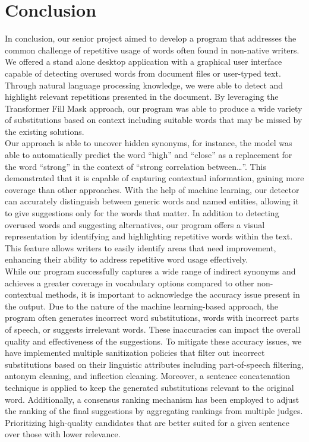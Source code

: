 \documentclass[12pt,oneside,openright,a4paper]{cpe-english-project}
\begin{document}
\chapter{Conclusion}

In conclusion, our senior project aimed to develop a program that addresses the common challenge of repetitive usage of words often found in non-native writers. We offered a stand alone desktop application with a graphical user interface capable of detecting overused words from document files or user-typed text. Through natural language processing knowledge, we were able to detect and highlight relevant repetitions presented in the document. By leveraging the Transformer Fill Mask approach, our program was able to produce a wide variety of substitutions based on context including suitable words that may be missed by the existing solutions.\\

Our approach is able to uncover hidden synonyms, for instance,  the model was able to automatically predict the word “high” and “close” as a replacement for the word “strong” in the context of “strong correlation between…”. This demonstrated that it is capable of capturing contextual information, gaining more coverage than other approaches.
With the help of machine learning, our detector can accurately distinguish between generic words and named entities, allowing it to give suggestions only for the words that matter. In addition to detecting overused words and suggesting alternatives, our program offers a visual representation by identifying and highlighting repetitive words within the text. This feature allows writers to easily identify areas that need improvement, enhancing their ability to address repetitive word usage effectively.\\



While our program successfully captures a wide range of indirect synonyms and achieves a greater coverage in vocabulary options compared to other non-contextual methods, it is important to acknowledge the accuracy issue present in the output. Due to the nature of the machine learning-based approach, the program often generates incorrect word substitutions, words with incorrect parts of speech, or suggests irrelevant words. These inaccuracies can impact the overall quality and effectiveness of the suggestions. To mitigate these accuracy issues, we have implemented multiple sanitization policies that filter out incorrect substitutions based on their linguistic attributes including part-of-speech filtering, antonym cleaning, and inflection cleaning. Moreover, a sentence concatenation technique is applied to keep the generated substitutions relevant to the original word. Additionally, a consensus ranking mechanism has been employed to adjust the ranking of the final suggestions by aggregating rankings from multiple judges. Prioritizing high-quality candidates that are better suited for a given sentence over those with lower relevance. \\
\end{document}
